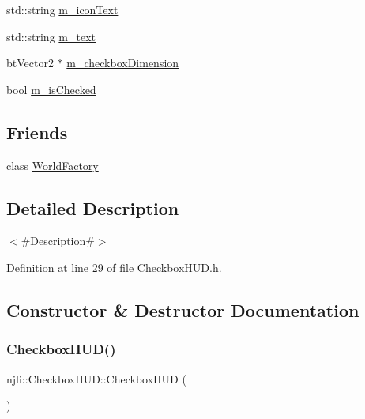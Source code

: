\begin{DoxyCompactItemize}
\item 
std\+::string \mbox{\hyperlink{classnjli_1_1_checkbox_h_u_d_aafd86237ddcbc55e4797d478b906bc2f}{m\+\_\+icon\+Text}}
\item 
std\+::string \mbox{\hyperlink{classnjli_1_1_checkbox_h_u_d_a5746b7e4e3127374c6761d077e061661}{m\+\_\+text}}
\item 
bt\+Vector2 $\ast$ \mbox{\hyperlink{classnjli_1_1_checkbox_h_u_d_a2b013bfab34f523e31de0eae6c113d2f}{m\+\_\+checkbox\+Dimension}}
\item 
bool \mbox{\hyperlink{classnjli_1_1_checkbox_h_u_d_a412e277cbdbd39ce605d81342ef11f91}{m\+\_\+is\+Checked}}
\end{DoxyCompactItemize}
\subsection*{Friends}
\begin{DoxyCompactItemize}
\item 
class \mbox{\hyperlink{classnjli_1_1_checkbox_h_u_d_acb96ebb09abe8f2a37a915a842babfac}{World\+Factory}}
\end{DoxyCompactItemize}


\subsection{Detailed Description}
$<$\#\+Description\#$>$ 

Definition at line 29 of file Checkbox\+H\+U\+D.\+h.



\subsection{Constructor \& Destructor Documentation}
\mbox{\label{classnjli_1_1_checkbox_h_u_d_aec11f8636407a40541f56c650ac8ce3e}} 
\subsubsection{\texorpdfstring{Checkbox\+H\+U\+D()}{CheckboxHUD()}\hspace{0.1cm}{\footnotesize\ttfamily [1/3]}}
{\footnotesize\ttfamily njli\+::\+Checkbox\+H\+U\+D\+::\+Checkbox\+H\+UD (\begin{DoxyParamCaption}{ }\end{DoxyParamCaption})\hspace{0.3cm}{\ttfamily [protected]}}

